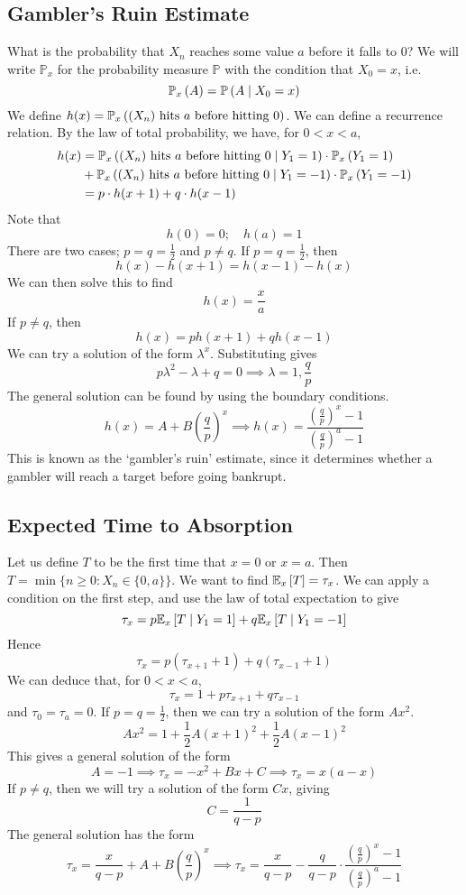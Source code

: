 \documentclass{article}
\begin{document}
\subsection{Gambler's Ruin Estimate}
What is the probability that $X_n$ reaches some value $a$ before it falls to 0? We will write $\mathbb P_x$ for the probability measure $\mathbb P$ with the condition that $X_0 = x$, i.e.
\[ \mathbb{P}_{x}\left({A}\right) = \mathbb{P}\left({A \mid X_0 = x}\right) \]
We define $h(x) = \mathbb{P}_{x}\left({(X_n) \text{ hits $a$ before hitting 0}}\right)$. We can define a recurrence relation. By the law of total probability, we have, for $0 < x < a$,
\begin{align*}
	h(x) & = \mathbb{P}_{x}\left({(X_n) \text{ hits $a$ before hitting 0} \mid Y_1 = 1}\right) \cdot \mathbb{P}_{x}\left({Y_1 = 1}\right)   \\
	     & + \mathbb{P}_{x}\left({(X_n) \text{ hits $a$ before hitting 0} \mid Y_1 = -1}\right) \cdot \mathbb{P}_{x}\left({Y_1 = -1}\right) \\
	     & = p \cdot h(x+1) + q \cdot h(x-1)
\end{align*}
Note that
\[ h(0) = 0;\quad h(a) = 1 \]
There are two cases; $p=q = \frac{1}{2}$ and $p \neq q$. If $p=q=\frac{1}{2}$, then
\[ h(x) - h(x+1) = h(x-1) - h(x) \]
We can then solve this to find
\[ h(x) = \frac{x}{a} \]
If $p \neq q$, then
\[ h(x) = ph(x+1) + qh(x-1) \]
We can try a solution of the form $\lambda^x$. Substituting gives
\[ p\lambda^2 - \lambda + q = 0 \implies \lambda = 1, \frac{q}{p} \]
The general solution can be found by using the boundary conditions.
\[ h(x) = A + B \left( \frac{q}{p} \right)^x \implies h(x) = \frac{\left( \frac{q}{p} \right)^x - 1}{\left( \frac{q}{p} \right)^a - 1} \]
This is known as the `gambler's ruin' estimate, since it determines whether a gambler will reach a target before going bankrupt.

\subsection{Expected Time to Absorption}
Let us define $T$ to be the first time that $x = 0$ or $x = a$. Then $T = \min \{ n \geq 0 \colon X_n \in \{ 0, a \} \}$. We want to find $\mathbb{E}_{x}\left[{T}\right] = \tau_x$. We can apply a condition on the first step, and use the law of total expectation to give
\[ \tau_x = p \mathbb{E}_{x}\left[{T \mid Y_1 = 1}\right] + q \mathbb{E}_{x}\left[{T \mid Y_1 = -1}\right] \]
Hence
\[ \tau_x = p (\tau_{x + 1} + 1) + q (\tau_{x - 1} + 1) \]
We can deduce that, for $0 < x < a$,
\[ \tau_x = 1 + p \tau_{x+1} + q \tau_{x-1} \]
and $\tau_0 = \tau_a = 0$. If $p = q = \frac{1}{2}$, then we can try a solution of the form $Ax^2$.
\[ Ax^2 = 1 + \frac{1}{2}A(x+1)^2 + \frac{1}{2}A(x-1)^2 \]
This gives a general solution of the form
\[ A = -1 \implies \tau_x = -x^2 + Bx + C \implies \tau_x = x(a-x) \]
If $p \neq q$, then we will try a solution of the form $Cx$, giving
\[ C = \frac{1}{q-p} \]
The general solution has the form
\[ \tau_x = \frac{x}{q-p} + A + B\left( \frac{q}{p} \right)^x \implies \tau_x = \frac{x}{q-p} - \frac{q}{q-p} \cdot \frac{\left( \frac{q}{p} \right)^x - 1}{\left( \frac{q}{p} \right)^a - 1}  \]
\end{document}
